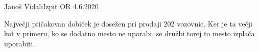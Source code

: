 \begin{naloga}{Janoš Vidali}{Izpit OR 4.6.2020}
\begin{odgovor}
\begin{enumerate}[(a)]
Največji pričakovan dobiček je dosežen pri prodaji $202$ vozovnic.
Ker je ta večji kot v primeru, ko se dodatno mesto ne uporabi,
se družbi torej to mesto izplača uporabiti.
\end{enumerate}
\end{odgovor}
\end{naloga}
